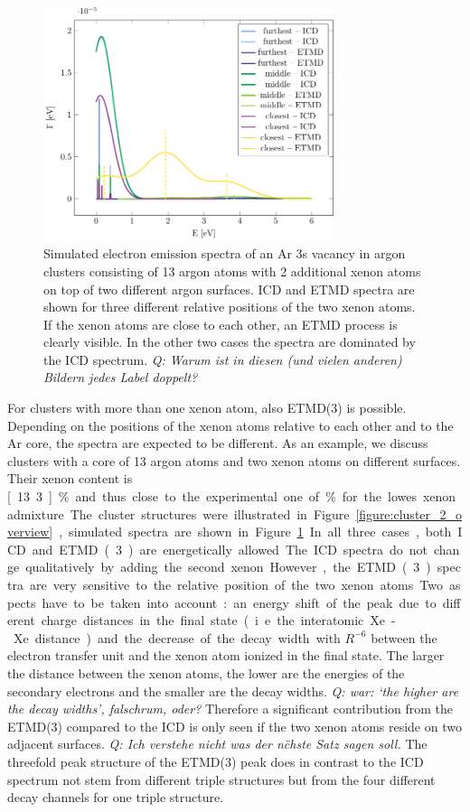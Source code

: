 \begin{figure}[ht]
 \centering
 \includegraphics[width=8.5cm]{pics/2tops.pdf}
 \caption{Simulated electron emission spectra of an Ar 3s vacancy in 
          argon clusters consisting of 13
          argon atoms with 2 additional xenon atoms on top of two different
          argon surfaces. ICD and ETMD spectra are shown for three
          different relative positions of the two xenon atoms. If 
          the xenon atoms are close to each other, an ETMD process is
          clearly visible. In the other two cases the spectra are dominated by
          the ICD spectrum.
          {\it Q: Warum ist in diesen (und vielen anderen) Bildern jedes Label doppelt?}}
 \label{figure:2tops}
\end{figure}
%
For clusters with more than one xenon atom, also ETMD(3) is possible.
Depending on the positions of the xenon atoms relative to each other and to the Ar core, the spectra are expected to be different.
As an example, we discuss clusters with a core of 13 argon atoms and two xenon atoms on different surfaces. 
Their xenon content is \unit[13.3]{\%} and thus close to the experimental one of \unit[10-12]{\%} for the lowes xenon admixture.
The cluster structures were illustrated in Figure \ref{figure:cluster_2_overview}, simulated spectra are shown in Figure \ref{figure:2tops}.
In all three cases, both ICD and ETMD(3) are energetically allowed. The ICD
spectra do not change qualitatively by adding the second xenon.
However, the ETMD(3) spectra
are very sensitive to the relative position of the two xenon atoms.
Two aspects have to be taken into account: an energy shift of the peak due
to different charge distances in the final state (i.e. the interatomic Xe-Xe
distance) and the decrease of the decay width with $R^{-6}$
between the electron transfer unit and the xenon atom ionized in the final state.
The larger the distance between the xenon atoms, the lower are the energies
of the secondary electrons and the smaller are the decay widths. 
{\it Q: war: `the higher are the decay widths', falschrum, oder?}
Therefore a
significant contribution from the ETMD(3) compared to the ICD is only
seen if the two xenon atoms reside on two adjacent
surfaces. 
{\it Q: Ich verstehe nicht was der n\"chste Satz sagen soll.}
The threefold peak structure of the ETMD(3) peak does in contrast to
the ICD spectrum not stem from different triple structures but from the
four different decay channels for one triple structure.

